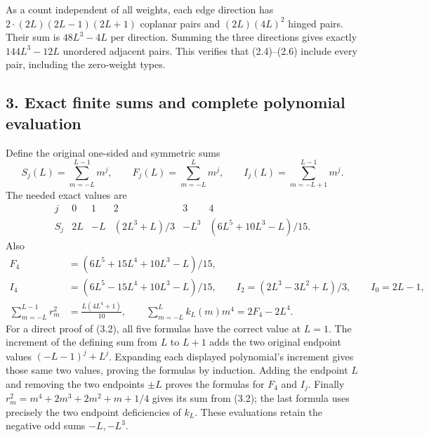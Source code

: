 \documentclass[
  11pt,
]{article}
\begin{document}
As a count independent of all weights, each edge direction has
\(2\cdot(2L)(2L-1)(2L+1)\) coplanar pairs and \((2L)(4L)^2\) hinged
pairs. Their sum is \(48L^3-4L\) per direction. Summing the three
directions gives exactly \(144L^3-12L\) unordered adjacent pairs. This
verifies that (2.4)--(2.6) include every pair, including the zero-weight
types.

\subsection{3. Exact finite sums and complete polynomial
evaluation}\label{magnetic-part-11-exact-finite-sums-and-complete-polynomial-evaluation}

Define the original one-sided and symmetric sums \[
 S_j(L)=\sum_{m=-L}^{L-1}m^j,
 \qquad F_j(L)=\sum_{m=-L}^{L}m^j,
 \qquad I_j(L)=\sum_{m=-L+1}^{L-1}m^j.
\tag{3.1}
\] The needed exact values are \[
\begin{array}{c|ccccc}
 j&0&1&2&3&4\\\hline
 S_j&2L&-L&(2L^3+L)/3&-L^3&(6L^5+10L^3-L)/15.
\end{array}
\tag{3.2}
\] Also \[
\begin{split}
 F_4&=(6L^5+15L^4+10L^3-L)/15,\\
 I_4&=(6L^5-15L^4+10L^3-L)/15,
 \qquad I_2=(2L^3-3L^2+L)/3,\qquad I_0=2L-1,\\
 \sum_{m=-L}^{L-1}r_m^2&=\frac{L(4L^4+1)}{10},\qquad
 \sum_{m=-L}^{L}k_L(m)m^4=2F_4-2L^4.
\end{split}
\tag{3.3}
\] For a direct proof of (3.2), all five formulas have the correct value
at \(L=1\). The increment of the defining sum from \(L\) to \(L+1\) adds
the two original endpoint values \((-L-1)^j+L^j\). Expanding each
displayed polynomial's increment gives those same two values, proving
the formulas by induction. Adding the endpoint \(L\) and removing the
two endpoints \(\pm L\) proves the formulas for \(F_4\) and \(I_j\).
Finally \(r_m^2=m^4+2m^3+2m^2+m+1/4\) gives its sum from (3.2); the last
formula uses precisely the two endpoint deficiencies of \(k_L\). These
evaluations retain the negative odd sums \(-L,-L^3\).
\end{document}
